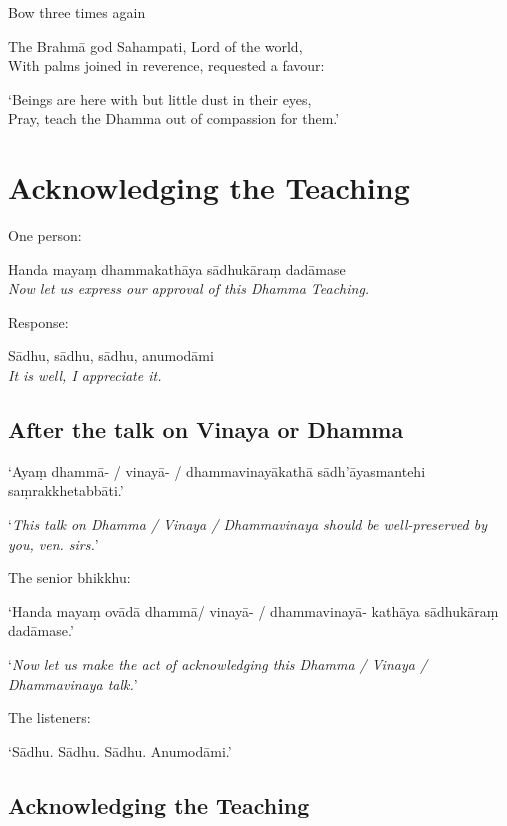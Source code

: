 \begin{instruction}
  Bow three times again
\end{instruction}

\begin{english}
The Brahmā god Sahampati, Lord of the world,\\
With palms joined in reverence, requested a favour:

`Beings are here with but little dust in their eyes,\\
Pray, teach the Dhamma out of compassion for them.' 
\end{english}

\section{Acknowledging the Teaching}

One person:

Handa mayaṃ dhammakathāya sādhukāraṃ dadāmase\\
\emph{Now let us express our approval of this Dhamma Teaching.}

Response:

Sādhu, sādhu, sādhu, anumodāmi\\
\emph{It is well, I appreciate it.}

\subsection{After the talk on Vinaya or Dhamma}

‘Ayaṃ dhammā- / vinayā- / dhammavinayākathā sādh'āyasmantehi saṃrakkhetabbāti.’

‘\emph{This talk on Dhamma / Vinaya / Dhammavinaya should be well-preserved by you, ven. sirs.}’

The senior bhikkhu:

‘Handa mayaṃ ovādā dhammā/ vinayā- / dhammavinayā- kathāya sādhukāraṃ dadāmase.’

‘\emph{Now let us make the act of acknowledging this Dhamma / Vinaya / Dhammavinaya talk.}’

\ifhandbookedition
\enlargethispage{\baselineskip}
\fi

The listeners:

‘Sādhu. Sādhu. Sādhu. Anumodāmi.’

\subsection{Acknowledging the Teaching}

